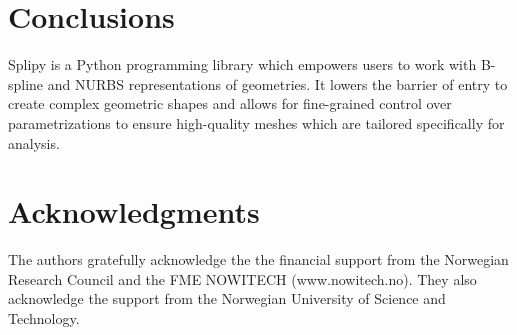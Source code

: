 \documentclass[preprint,12pt, a4paper]{elsarticle}
\begin{document}

\section{Conclusions}
\label{sec:conclusion}

Splipy is a Python programming library which empowers users to work with B-spline and NURBS representations of geometries.
It lowers the barrier of entry to create complex geometric shapes and allows for fine-grained control over parametrizations to ensure high-quality meshes which are tailored specifically for analysis.

\section*{Acknowledgments}
\label{}

The authors gratefully acknowledge the the financial support from the Norwegian Research Council and the FME NOWITECH (www.nowitech.no). They also acknowledge the support from the Norwegian University of Science and Technology.



{}

\end{document}
